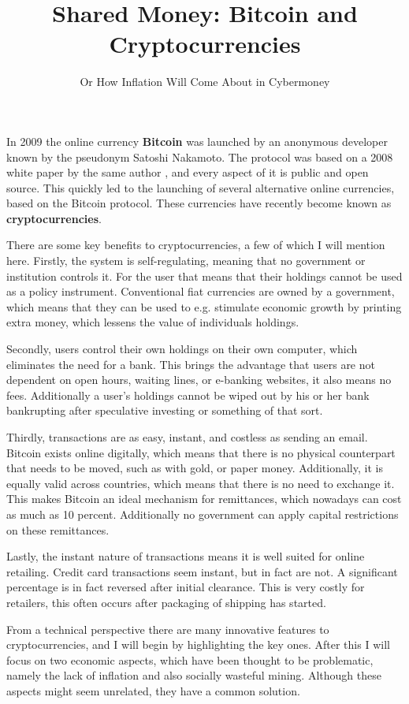 \documentclass[12pt]{article}\usepackage[]{graphicx}\usepackage[]{color}
\title{Shared Money: Bitcoin and Cryptocurrencies}
\author{Or How Inflation Will Come About in Cybermoney}
\begin{document}
\maketitle
In 2009 the online currency \textbf{Bitcoin} was launched by an anonymous developer known by the pseudonym Satoshi Nakamoto.
The protocol was based on a 2008 white paper by the same author \parencite{nakamoto2008bitcoin}, and every aspect of it is public and open source.
This quickly led to the launching of several alternative online currencies, based on the Bitcoin protocol.
These currencies have recently become known as \textbf{cryptocurrencies}.

There are some key benefits to cryptocurrencies, a few of which I will mention here.
Firstly, the system is self-regulating, meaning that no government or institution controls it.
For the user that means that their holdings cannot be used as a policy instrument.
Conventional fiat currencies are owned by a government,
which means that they can be used to e.g. stimulate economic growth by printing extra money,
which lessens the value of individuals holdings.

Secondly, users control their own holdings on their own computer, which eliminates the need for a bank.
This brings the advantage that users are not dependent on open hours,
waiting lines, or e-banking websites, it also means no fees.
Additionally a user's holdings cannot be wiped out by his or her bank bankrupting after speculative investing or something of that sort.

Thirdly, transactions are as easy, instant, and costless as sending an email.
Bitcoin exists online digitally,
which means that there is no physical counterpart that needs to be moved,
such as with gold, or paper money.
Additionally, it is equally valid across countries, which means that there is no need to exchange it.
This makes Bitcoin an ideal mechanism for remittances, which nowadays can cost as much as 10 percent.
Additionally no government can apply capital restrictions on these remittances.

Lastly, the instant nature of transactions means it is well suited for online retailing.
Credit card transactions seem instant, but in fact are not.
A significant percentage is in fact reversed after initial clearance.
This is very costly for retailers, this often occurs after packaging of shipping has started.

From a technical perspective there are many innovative features to cryptocurrencies,
and I will begin by highlighting the key ones.
After this I will focus on two economic aspects, which have been thought to be problematic,
namely the lack of inflation and also socially wasteful mining.
Although these aspects might seem unrelated, they have a common solution.
\end{document}
